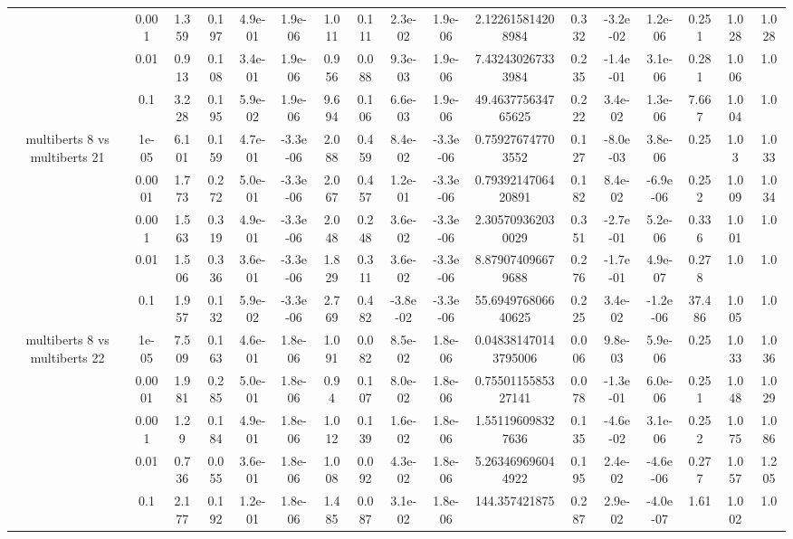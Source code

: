\begin{tabular}{|c|c|c|c|c|c|c|c|c|c|c|c|c|c|c|c|c|}
 & 0.001 & 1.359 & 0.197 & 4.9e-01 & 1.9e-06 & 1.011 & 0.111 & 2.3e-02 & 1.9e-06 & 2.122615814208984 & 0.332 & -3.2e-02 & 1.2e-06 & 0.251 & 1.028 & 1.028 \\
 & 0.01 & 0.913 & 0.108 & 3.4e-01 & 1.9e-06 & 0.956 & 0.088 & 9.3e-03 & 1.9e-06 & 7.432430267333984 & 0.235 & -1.4e-01 & 3.1e-06 & 0.281 & 1.006 & 1.0 \\
 & 0.1 & 3.228 & 0.195 & 5.9e-02 & 1.9e-06 & 9.694 & 0.106 & 6.6e-03 & 1.9e-06 & 49.463775634765625 & 0.222 & 3.4e-02 & 1.3e-06 & 7.667 & 1.004 & 1.0 \\
\hline
\multirow{5}{*}{multiberts 8 vs multiberts 21} & 1e-05 & 6.101 & 0.159 & 4.7e-01 & -3.3e-06 & 2.088 & 0.459 & 8.4e-02 & -3.3e-06 & 0.759276747703552 & 0.127 & -8.0e-03 & 3.8e-06 & 0.25 & 1.03 & 1.033 \\
 & 0.0001 & 1.773 & 0.272 & 5.0e-01 & -3.3e-06 & 2.067 & 0.457 & 1.2e-01 & -3.3e-06 & 0.7939214706420891 & 0.182 & 8.4e-02 & -6.9e-06 & 0.252 & 1.009 & 1.034 \\
 & 0.001 & 1.563 & 0.319 & 4.9e-01 & -3.3e-06 & 2.048 & 0.248 & 3.6e-02 & -3.3e-06 & 2.305709362030029 & 0.351 & -2.7e-01 & 5.2e-06 & 0.336 & 1.001 & 1.0 \\
 & 0.01 & 1.506 & 0.336 & 3.6e-01 & -3.3e-06 & 1.829 & 0.311 & 3.6e-02 & -3.3e-06 & 8.879074096679688 & 0.276 & -1.7e-01 & 4.9e-07 & 0.278 & 1.0 & 1.0 \\
 & 0.1 & 1.957 & 0.132 & 5.9e-02 & -3.3e-06 & 2.769 & 0.482 & -3.8e-02 & -3.3e-06 & 55.694976806640625 & 0.225 & 3.4e-02 & -1.2e-06 & 37.486 & 1.005 & 1.0 \\
\hline
\multirow{5}{*}{multiberts 8 vs multiberts 22} & 1e-05 & 7.509 & 0.163 & 4.6e-01 & 1.8e-06 & 1.091 & 0.082 & 8.5e-02 & 1.8e-06 & 0.048381470143795006 & 0.006 & 9.8e-03 & 5.9e-06 & 0.25 & 1.033 & 1.036 \\
 & 0.0001 & 1.981 & 0.285 & 5.0e-01 & 1.8e-06 & 0.94 & 0.107 & 8.0e-02 & 1.8e-06 & 0.7550115585327141 & 0.078 & -1.3e-01 & 6.0e-06 & 0.251 & 1.048 & 1.029 \\
 & 0.001 & 1.29 & 0.184 & 4.9e-01 & 1.8e-06 & 1.012 & 0.139 & 1.6e-02 & 1.8e-06 & 1.551196098327636 & 0.135 & -4.6e-02 & 3.1e-06 & 0.252 & 1.075 & 1.086 \\
 & 0.01 & 0.736 & 0.055 & 3.6e-01 & 1.8e-06 & 1.008 & 0.092 & 4.3e-02 & 1.8e-06 & 5.263469696044922 & 0.195 & 2.4e-02 & -4.6e-06 & 0.277 & 1.057 & 1.205 \\
 & 0.1 & 2.177 & 0.192 & 1.2e-01 & 1.8e-06 & 1.485 & 0.087 & 3.1e-02 & 1.8e-06 & 144.357421875 & 0.287 & 2.9e-02 & -4.0e-07 & 1.61 & 1.002 & 1.0 \\

\end{tabular}
